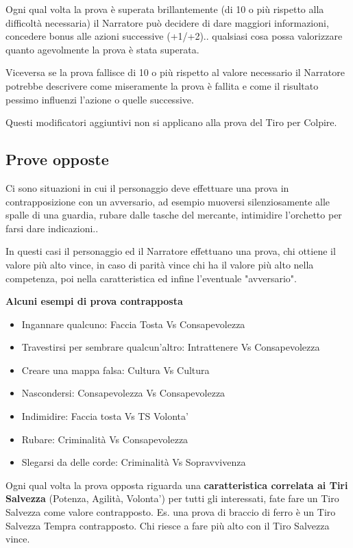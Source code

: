 \documentclass[a4paper,11pt,twoside,openany]{book}
\begin{document}
Ogni qual volta la prova è superata brillantemente (di 10 o più rispetto alla difficoltà necessaria) il Narratore può decidere di dare maggiori informazioni, concedere bonus alle azioni successive (+1/+2).. qualsiasi cosa possa valorizzare quanto agevolmente la prova è stata superata.

Viceversa se la prova fallisce di 10 o più rispetto al valore necessario il Narratore potrebbe descrivere come miseramente la prova è fallita e come il risultato pessimo influenzi l'azione o quelle successive.

Questi modificatori aggiuntivi non si applicano alla prova del Tiro per Colpire.

\subsection{Prove opposte}

Ci sono situazioni in cui il personaggio deve effettuare una prova in contrapposizione con un avversario, ad esempio muoversi silenziosamente alle spalle di una guardia, rubare dalle tasche del mercante, intimidire l'orchetto per farsi dare indicazioni..

In questi casi il personaggio ed il Narratore effettuano una prova, chi ottiene il valore più alto vince, in caso di parità vince chi ha il valore più alto nella competenza, poi nella caratteristica ed infine l'eventuale "avversario".

\bigskip

\textbf{Alcuni esempi di prova contrapposta}

\begin{itemize}
	\item Ingannare qualcuno: Faccia Tosta Vs Consapevolezza
	\item Travestirsi per sembrare qualcun'altro: Intrattenere Vs Consapevolezza
	\item Creare una mappa falsa: Cultura Vs Cultura
	\item Nascondersi: Consapevolezza Vs Consapevolezza
	\item Indimidire: Faccia tosta Vs TS Volonta'
	\item Rubare: Criminalità Vs Consapevolezza
	\item Slegarsi da delle corde: Criminalità Vs Sopravvivenza
\end{itemize}

Ogni qual volta la prova opposta riguarda una \textbf{caratteristica correlata ai Tiri Salvezza} (Potenza, Agilità, Volonta') per tutti gli interessati, fate fare un Tiro Salvezza come valore contrapposto. Es. una prova di braccio di ferro è un Tiro Salvezza Tempra contrapposto. Chi riesce a fare più alto con il Tiro Salvezza vince.
\end{document}
